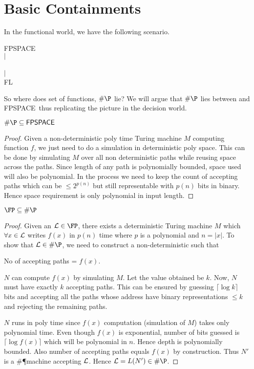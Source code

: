 \documentclass{report}
\newcommand{\FPSPACE}{{\sf FPSPACE~}}
\begin{document}
\section{Basic Containments}
In the functional world, we have the following scenario.
\begin{center}
\FPSPACE \\
$\vert$ \\
\FP \\
$\vert$ \\
{\sf FL }
\end{center}

So where does set of functions, $\#\P$ lie? We will argue that $\#\P$ lies between 
\FP and \FPSPACE thus replicating the picture in the decision world.
\begin{lemma}
$\#\P \subseteq \FPSPACE$
\end{lemma}
\begin{proof}
Given a non-deterministic poly time Turing machine $M$ computing function $f$,
we just need to do a simulation in deterministic poly space. This can be done by
simulating $M$ over all non deterministic paths while reusing space across the
paths. Since length of any path is polynomially bounded, space used will also
be polynomial. In the process we need to keep the count of accepting paths
which can be $\le 2^{p(n)}$ but still representable with $p(n)$ bits in
binary. Hence space requirement is only polynomial in input length.
\end{proof}

\begin{lemma}
$\FP \subseteq \#\P$
\end{lemma}
\begin{proof}
Given an $\calL \in \FP$, there exists a deterministic Turing machine $M$ which
$\forall x \in {\cal L}$ writes $f(x)$ in $p(n)$ time where $p$ is a polynomial
and $n = |x|$. To show that $\calL \in \#\P$, we need to construct a
non-deterministic  such that
\begin{center}
No of accepting paths = $f(x)$.
\end{center}
$N$ can compute $f(x)$ by simulating $M$. Let the value obtained be $k$. Now,
$N$ must have exactly $k$ accepting paths. This can be ensured by guessing
$\lceil \log k \rceil$ bits and accepting all the paths whose address have
binary representations  $\le k$ and rejecting the remaining paths.

$N$ runs in poly time since $f(x)$ computation (simulation of $M$) takes only
polynomial time. Even though $f(x)$ is exponential, number of bits guessed is
$\lceil \log f(x) \rceil$ which will be polynomial in $n$. Hence depth is
polynomially bounded. Also number of accepting paths equals $f(x)$ by
construction. Thus $N'$ is a \#\P machine accepting ${\cal L}$. Hence $\calL =
L(N') \in \#\P$.
\end{proof}
\end{document}
